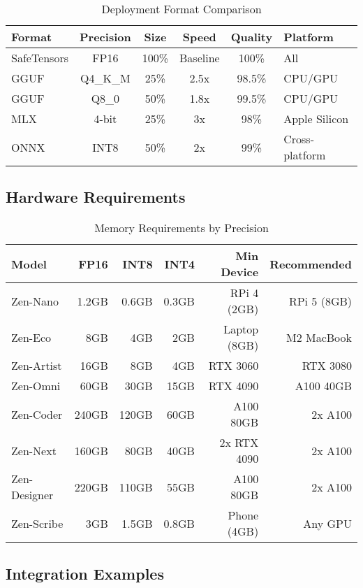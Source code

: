 \documentclass[11pt,a4paper]{article}
\begin{document}
\begin{table}[H]
\centering
\small
\begin{tabular}{lccccl}
\toprule
\textbf{Format} & \textbf{Precision} & \textbf{Size} & \textbf{Speed} & \textbf{Quality} & \textbf{Platform} \\
\midrule
SafeTensors & FP16 & 100\% & Baseline & 100\% & All \\
GGUF & Q4\_K\_M & 25\% & 2.5x & 98.5\% & CPU/GPU \\
GGUF & Q8\_0 & 50\% & 1.8x & 99.5\% & CPU/GPU \\
MLX & 4-bit & 25\% & 3x & 98\% & Apple Silicon \\
ONNX & INT8 & 50\% & 2x & 99\% & Cross-platform \\
\bottomrule
\end{tabular}
\caption{Deployment Format Comparison}
\end{table}

\subsection{Hardware Requirements}

\begin{table}[H]
\centering
\footnotesize
\begin{tabular}{lrrrrr}
\toprule
\textbf{Model} & \textbf{FP16} & \textbf{INT8} & \textbf{INT4} & \textbf{Min Device} & \textbf{Recommended} \\
\midrule
Zen-Nano & 1.2GB & 0.6GB & 0.3GB & RPi 4 (2GB) & RPi 5 (8GB) \\
Zen-Eco & 8GB & 4GB & 2GB & Laptop (8GB) & M2 MacBook \\
Zen-Artist & 16GB & 8GB & 4GB & RTX 3060 & RTX 3080 \\
Zen-Omni & 60GB & 30GB & 15GB & RTX 4090 & A100 40GB \\
Zen-Coder & 240GB & 120GB & 60GB & A100 80GB & 2x A100 \\
Zen-Next & 160GB & 80GB & 40GB & 2x RTX 4090 & 2x A100 \\
Zen-Designer & 220GB & 110GB & 55GB & A100 80GB & 2x A100 \\
Zen-Scribe & 3GB & 1.5GB & 0.8GB & Phone (4GB) & Any GPU \\
\bottomrule
\end{tabular}
\caption{Memory Requirements by Precision}
\end{table}

\subsection{Integration Examples}
\end{document}
